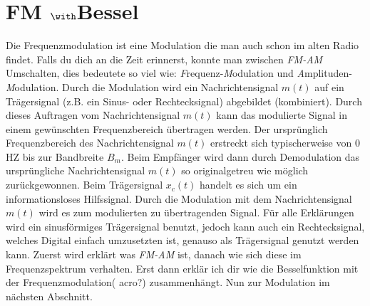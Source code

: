 %
%
% 

\chapter{FM \(\with\)Bessel\label{chapter:fm}}
\begin{refsection}


Die Frequenzmodulation ist eine Modulation die man auch schon im alten Radio findet. 
Falls du dich an die Zeit erinnerst, konnte man zwischen \textit{FM-AM} Umschalten, 
dies bedeutete so viel wie: \textit{F}requenz-\textit{M}odulation und \textit{A}mplituden-\textit{M}odulation.
Durch die Modulation wird ein Nachrichtensignal \(m(t)\) auf ein Trägersignal (z.B. ein Sinus- oder Rechtecksignal) abgebildet (kombiniert).
Durch dieses Auftragen vom Nachrichtensignal \(m(t)\) kann das modulierte Signal in einem gewünschten Frequenzbereich übertragen werden.
Der ursprünglich Frequenzbereich des Nachrichtensignal \(m(t)\) erstreckt sich typischerweise von 0 HZ bis zur Bandbreite \(B_m\).
\newline
Beim Empfänger wird dann durch Demodulation das ursprüngliche Nachrichtensignal \(m(t)\) so originalgetreu wie möglich zurückgewonnen.
\newline
Beim Trägersignal \(x_c(t)\) handelt es sich um ein informationsloses Hilfssignal.
Durch die Modulation mit dem Nachrichtensignal \(m(t)\) wird es zum modulierten zu übertragenden Signal.
Für alle Erklärungen wird ein sinusförmiges Trägersignal benutzt, jedoch kann auch ein Rechtecksignal,
welches Digital einfach umzusetzten ist, 
genauso als Trägersignal genutzt werden kann.
Zuerst wird erklärt was \textit{FM-AM} ist, danach wie sich diese im Frequenzspektrum verhalten.
Erst dann erklär ich dir wie die Besselfunktion mit der Frequenzmodulation( acro?) zusammenhängt.
Nun zur Modulation im nächsten Abschnitt.






\printbibliography[heading=subbibliography]
\end{refsection}


